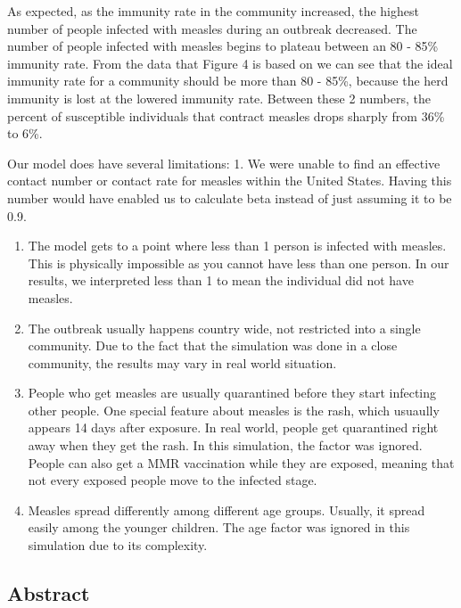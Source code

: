 \documentclass[11pt]{article}
\begin{document}
As expected, as the immunity rate in the community increased, the
highest number of people infected with measles during an outbreak
decreased. The number of people infected with measles begins to plateau
between an 80 - 85\% immunity rate. From the data that Figure 4 is based
on we can see that the ideal immunity rate for a community should be
more than 80 - 85\%, because the herd immunity is lost at the lowered
immunity rate. Between these 2 numbers, the percent of susceptible
individuals that contract measles drops sharply from 36\% to 6\%.

Our model does have several limitations: 1. We were unable to find an
effective contact number or contact rate for measles within the United
States. Having this number would have enabled us to calculate beta
instead of just assuming it to be 0.9.

\begin{enumerate}
\def\labelenumi{\arabic{enumi}.}
\setcounter{enumi}{1}
\item
  The model gets to a point where less than 1 person is infected with
  measles. This is physically impossible as you cannot have less than
  one person. In our results, we interpreted less than 1 to mean the
  individual did not have measles.
\item
  The outbreak usually happens country wide, not restricted into a
  single community. Due to the fact that the simulation was done in a
  close community, the results may vary in real world situation.
\item
  People who get measles are usually quarantined before they start
  infecting other people. One special feature about measles is the rash,
  which usuaully appears 14 days after exposure. In real world, people
  get quarantined right away when they get the rash. In this simulation,
  the factor was ignored. People can also get a MMR vaccination while
  they are exposed, meaning that not every exposed people move to the
  infected stage.
\item
  Measles spread differently among different age groups. Usually, it
  spread easily among the younger children. The age factor was ignored
  in this simulation due to its complexity.
\end{enumerate}

    \hypertarget{abstract}{%
\subsection{Abstract}\label{abstract}}
\end{document}
